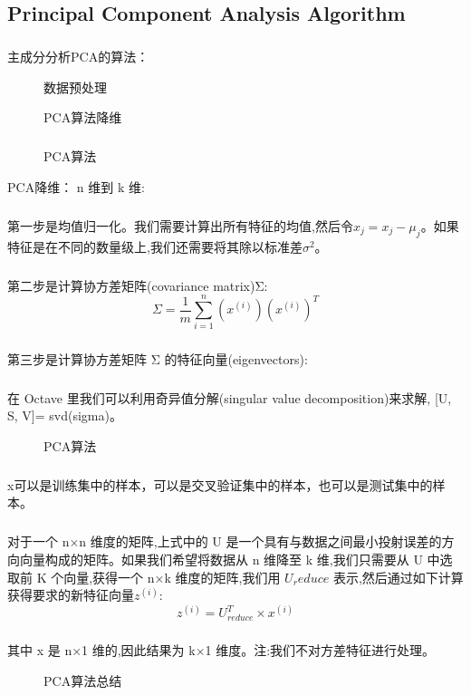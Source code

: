\documentclass{article}
\begin{document}
\begin{CJK}{UTF8}{gbsn}
\subsection{Principal Component Analysis Algorithm}
\subparagraph{}
主成分分析PCA的算法：
\begin{figure}[H]
\label{fig:846}
\caption{数据预处理}
\end{figure}
\begin{figure}[H]
\label{fig:847}
\caption{PCA算法降维}
\end{figure}
\subparagraph{}
\begin{figure}[H]
\label{fig:849}
\caption{PCA算法}
\end{figure}
PCA降维： n 维到 k 维:
\subparagraph{}
第一步是均值归一化。我们需要计算出所有特征的均值,然后令$x_j=x_j-\mu_j$。如果特征是在不同的数量级上,我们还需要将其除以标准差$\sigma^2$。
\subparagraph{}
第二步是计算协方差矩阵(covariance matrix)Σ:
\begin{equation}
\Sigma=\frac{1}{m}\sum_{i=1}^n{(x^{(i)}){(x^{(i)})}^T}
\end{equation}
\subparagraph{}
第三步是计算协方差矩阵 Σ 的特征向量(eigenvectors):
\subparagraph{}
在 Octave 里我们可以利用奇异值分解(singular value decomposition)来求解, [U, S, V]=
svd(sigma)。
\begin{figure}[H]
\label{fig:850}
\caption{PCA算法 }
\end{figure}
\subparagraph{}
x可以是训练集中的样本，可以是交叉验证集中的样本，也可以是测试集中的样本。
\subparagraph{}
对于一个 n×n 维度的矩阵,上式中的 U 是一个具有与数据之间最小投射误差的方向向量构成的矩阵。如果我们希望将数据从 n 维降至 k 维,我们只需要从 U 中选取前 K 个向量,获得一个 n×k 维度的矩阵,我们用 $U_reduce$ 表示,然后通过如下计算获得要求的新特征向量$z^{(i)}$:
\begin{equation}
z^{(i)}=U_{reduce}^T\times{x^{(i)}}
\end{equation}
\subparagraph{}
其中 x 是 n×1 维的,因此结果为 k×1 维度。注:我们不对方差特征进行处理。
\begin{figure}[H]
\label{fig:851}
\caption{PCA算法总结}
\end{figure}
\begin{figure}[H]
\label{fig:852}
\end{figure}

\end{CJK}
\end{document}
